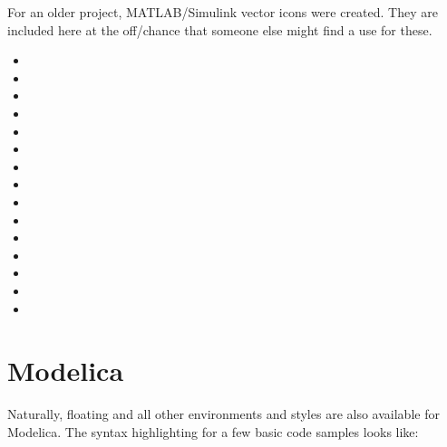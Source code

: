 For an older project, MATLAB/Simulink vector icons were created.
They are included here at the off\-/chance that someone else might find a use for these.
\begin{itemize}
    \item {}
    \item {}
    \item {}
    \item {}
    \item {}
    \item {}
    \item {}
    \item {}
    \item {}
    \item {}
    \item {}
    \item {}
    \item {}
    \item {}
    \item {}
\end{itemize}

\section{Modelica}

Naturally, floating and all other environments and styles are also available for
Modelica.
The syntax highlighting for a few basic code samples \autocite{wikipediacontributorsModelica2021} looks like:

